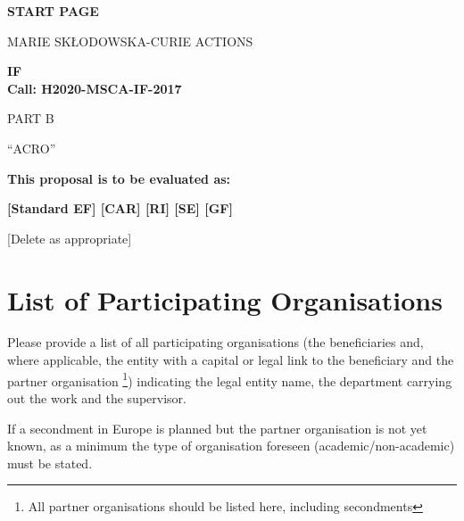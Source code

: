 
\phantom{a}
\vspace{15mm}
\begin{center}
	
	
	\Large{
		
		
		\textbf{START PAGE}
		
		\vspace{15mm}
		MARIE SK\L{}ODOWSKA-CURIE ACTIONS\\
		\vspace{1cm}
		
		\textbf{\acf{IF}}\\
		\textbf{Call: H2020-MSCA-IF-2017}
		\vspace{2cm}                   
		
		PART B
		\vspace{2.5cm}
		
		``{\sc \ac{ACRO}\xspace}''
		\vspace{2cm}
		
		\textbf{This proposal is to be evaluated as:}
		\vspace{.5cm}
		
		\textbf{[Standard EF] [CAR] [RI] [SE] [GF]}\\
	}
	\large{[Delete as appropriate]}
	
\end{center}
\vspace{1cm}

\newpage
\setcounter{tocdepth}{1}
\tableofcontents


\newpage
{}
\section*{List of Participating Organisations}
\label{sec:participants}

Please provide a list of all participating organisations (the beneficiaries and, where applicable, the entity with a capital or legal link to the beneficiary and the partner organisation%
\footnote{All partner organisations should be listed here, including secondments}) indicating the legal entity name, the department carrying out the work and the supervisor.

\medskip\noindent
If a secondment in Europe is planned but the partner organisation is not yet known, as a minimum the type of organisation foreseen (academic/non-academic) must be stated.

